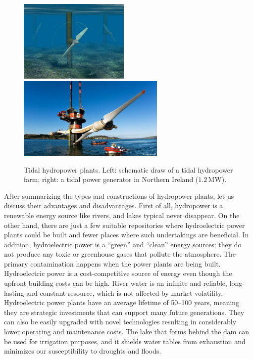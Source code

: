\begin{figure}[ht!]
	\centering
		\includegraphics[height=4cm]{HydroAndWindPower/Figures/Schematics_Of_Tidal_Hydropower.jpg}
		\includegraphics[height=4cm]{HydroAndWindPower/Figures/Tidal_Hydropower_In_Northen_Ireland.jpg}
	\caption{Tidal hydropower plants. Left: schematic draw of a tidal hydropower farm; right: a tidal power generator in Northern Ireland ($1.2\,\mathrm{MW}$).}
	\label{Fig:tidal_hydropower}
\end{figure}

After summarizing the types and constructions of hydropower plants, let us discuss their advantages and disadvantages. First of all, hydropower is a renewable energy source like rivers, and lakes typical never disappear. On the other hand, there are just a few suitable repositories where hydroelectric power plants could be built and fewer places where such undertakings are beneficial. In addition, hydroelectric power is a ``green'' and ``clean'' energy sources; they do not produce any toxic or greenhouse gases that pollute the atmosphere. The primary contamination happens when the power plants are being built. Hydroelectric power is a cost-competitive source of energy even though the upfront building costs can be high. River water is an infinite and reliable, long-lasting and constant resource, which is not affected by market volatility. Hydroelectric power plants have an average lifetime of 50–100 years, meaning they are strategic investments that can support many future generations. They can also be easily upgraded with novel technologies resulting in considerably lower operating and maintenance costs. The lake that forms behind the dam can be used for irrigation purposes, and it shields water tables from exhaustion and minimizes our susceptibility to droughts and floods.

